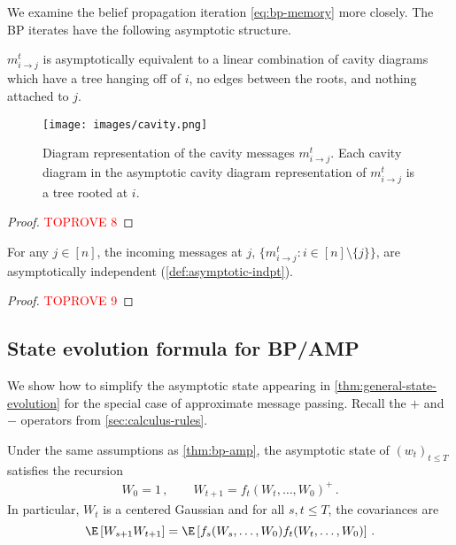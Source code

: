 \documentclass[12pt]{article}
\begin{document}
We examine the belief propagation iteration
\cref{eq:bp-memory} more closely.
The BP iterates have the following asymptotic structure.


\begin{lemma}\label{lem:mij-structure}
    $m_{i \to j}^t$ is asymptotically
    equivalent to a linear combination of cavity diagrams which 
    have a tree hanging off of $i$, no edges between the roots, and nothing attached to $j$.
    \begin{figure}[ht]
    \centering
    \texttt{[image: images/cavity.png]} 
    \caption{
    Diagram representation of the cavity messages $m^t_{i\to j}$. Each cavity diagram in the asymptotic cavity diagram representation of $m^t_{i\to j}$ is a tree rooted at $i$.}
    \label{fig:cavity}
\end{figure}
\end{lemma}

\begin{proof}\textcolor{red}{TOPROVE 8}\end{proof}



\begin{theorem}
    \label{thm:cavity-formal}
    For any $j\in [n]$, the incoming messages
    at $j$, $\{m^t_{i\to j}:i\in [n]\setminus\{j\}\}$, are
    asymptotically independent (\cref{def:asymptotic-indpt}).
\end{theorem}

\begin{proof}\textcolor{red}{TOPROVE 9}\end{proof}

\subsection{State evolution formula for BP/AMP}
\label{sec:amp}

We show how to simplify
the asymptotic state appearing in 
\cref{thm:general-state-evolution}
for the special case of approximate message
passing.
Recall the $+$ and $-$ operators from \cref{sec:calculus-rules}.

\begin{theorem}
    \label{thm:amp-state}
    Under the same assumptions as \cref{thm:bp-amp}, the asymptotic state of $(w_t)_{t\le T}$ satisfies the recursion
    \begin{align}
        W_0 = 1\,,\qquad W_{t+1} = f_{t}(W_{t},\ldots,W_0)^+\,.\label{eq:amp-asymp}
    \end{align}
    In particular, $W_t$ is a centered Gaussian and for all $s,t\le T$, the covariances are
    \[
        \E \left[W_{s+1} W_{t+1}\right]= \E \left[f_s(W_s,\ldots,W_0) f_t(W_t,\ldots,W_0)\right]\,.
    \]
\end{theorem}
\end{document}

